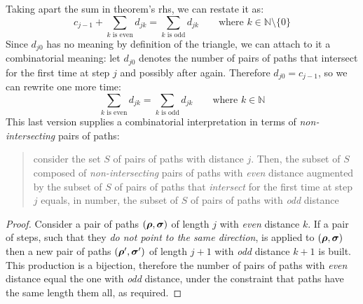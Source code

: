 Taking apart the sum in theorem's \ac{rhs}, we can restate it as:
\begin{displaymath}                
    c_{j-1} + \sum_{{k \text{ is even}}}{d_{jk}}
        = \sum_{{k \text{ is odd}}}{d_{jk}}\qquad\text{where } k\in\mathbb{N}\setminus \lbrace0\rbrace
\end{displaymath}
Since $d_{j0}$ has no meaning by definition of the triangle, we can
attach to it a combinatorial meaning: let $d_{j0}$ denotes the
number of pairs of paths that intersect for the first time at
step $j$ and possibly after again. Therefore $d_{j0}=c_{j-1}$, so 
we can rewrite one more time:
\begin{displaymath}                
    \sum_{{k \text{ is even}}}{d_{jk}}
        = \sum_{{k \text{ is odd}}}{d_{jk}} \qquad\text{where } k\in\mathbb{N}
\end{displaymath}
This last version supplies a combinatorial 
interpretation in terms of \emph{non-intersecting} pairs of paths:
\begin{quote}
    consider the set $S$ of pairs of paths with distance $j$. Then,
    the subset of $S$ composed of \emph{non-intersecting} pairs of paths 
    with \emph{even} distance augmented by the subset of $S$ of 
    pairs of paths that \emph{intersect} for the first time at step $j$
    equals, in number, the subset of $S$ of pairs of paths with \emph{odd}
    distance
\end{quote}
\begin{proof}

    Consider a pair of paths $(\boldsymbol{\rho},\boldsymbol{\sigma})$ of length $j$ with
    \emph{even} distance $k$.  If a pair of steps, such that they \emph{do not
    point to the same direction}, is applied to $(\boldsymbol{\rho},\boldsymbol{\sigma})$
    then a new pair of paths $(\boldsymbol{\rho}^{\prime},\boldsymbol{\sigma}^{\prime})$ of
    length $j+1$ with \emph{odd} distance $k+1$ is built. This production is a
    bijection, therefore the number of pairs of paths with \emph{even} distance
    equal the one with \emph{odd} distance, under the constraint that paths
    have the same length them all, as required.

\end{proof}



















